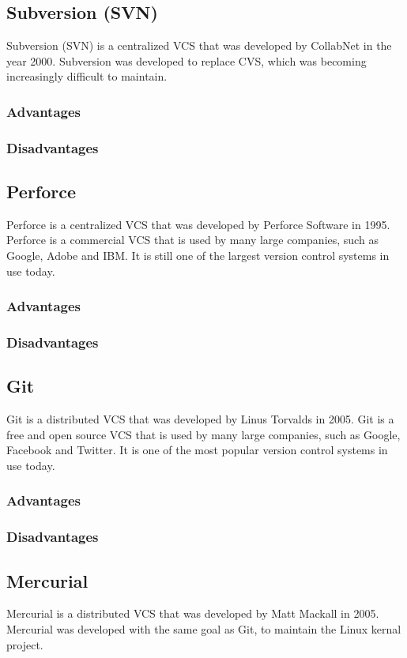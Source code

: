 \subsection{Subversion (SVN)}
Subversion (SVN) is a centralized VCS that was developed by CollabNet in the year 2000. Subversion was developed to replace CVS, which was becoming increasingly difficult to maintain. 
\subsubsection{Advantages}
\subsubsection{Disadvantages}
\subsection{Perforce}
Perforce is a centralized VCS that was developed by Perforce Software in 1995. Perforce is a commercial VCS that is used by many large companies, such as Google, Adobe and IBM. It is still one of the largest version control systems in use today.
\subsubsection{Advantages}
\subsubsection{Disadvantages}
\subsection{Git}
Git is a distributed VCS that was developed by Linus Torvalds in 2005. Git is a free and open source VCS that is used by many large companies, such as Google, Facebook and Twitter. It is one of the most popular version control systems in use today.
\subsubsection{Advantages}
\subsubsection{Disadvantages}
\subsection{Mercurial}
Mercurial is a distributed VCS that was developed by Matt Mackall in 2005. Mercurial was developed with the same goal as Git, to maintain the Linux kernal project. 
